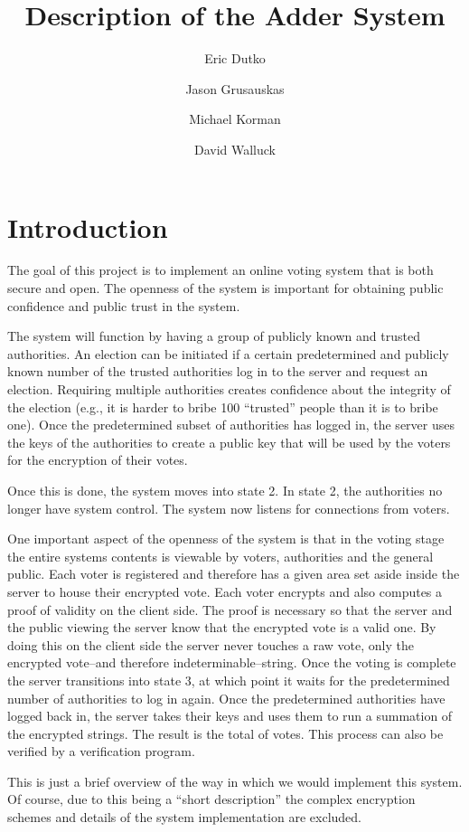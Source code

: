 \documentclass[letterpaper,10pt]{article}
\author{Eric Dutko \and Jason Grusauskas \and Michael Korman \and David Walluck}
\title{Description of the Adder System}
\begin{document}
\maketitle

\section{Introduction}

The goal of this project is to implement an online voting system that
is both secure and open. The openness of the system is important for
obtaining public confidence and public trust in the system.

The system will function by having a group of publicly known and
trusted authorities. An election can be initiated if a certain
predetermined and publicly known number of the trusted authorities log
in to the server and request an election. Requiring multiple
authorities creates confidence about the integrity of the election
(e.g., it is harder to bribe 100 ``trusted'' people than it is to
bribe one). Once the predetermined subset of authorities has logged
in, the server uses the keys of the authorities to create a public key
that will be used by the voters for the encryption of their votes.

Once this is done, the system moves into state 2. In state 2, the
authorities no longer have system control. The system now listens for
connections from voters.  

One important aspect of the openness of the system is that in the
voting stage the entire systems contents is viewable by voters,
authorities and the general public. Each voter is registered and
therefore has a given area set aside inside the server to house their
encrypted vote. Each voter encrypts and also computes a proof of
validity on the client side. The proof is necessary so that the server
and the public viewing the server know that the encrypted vote is a
valid one. By doing this on the client side the server never touches a
raw vote, only the encrypted vote--and therefore
indeterminable--string. Once the voting is complete the server
transitions into state 3, at which point it waits for the
predetermined number of authorities to log in again. Once the
predetermined authorities have logged back in, the server takes their
keys and uses them to run a summation of the encrypted strings. The
result is the total of votes. This process can also be verified by a
verification program.

This is just a brief overview of the way in which we would implement
this system. Of course, due to this being a ``short description'' the
complex encryption schemes and details of the system implementation
are excluded.
\end{document}
